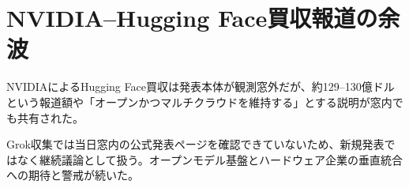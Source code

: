 \section{NVIDIA--Hugging Face買収報道の余波}
NVIDIAによるHugging Face買収は発表本体が観測窓外だが、約129--130億ドルという報道額や「オープンかつマルチクラウドを維持する」とする説明が窓内でも共有された。

Grok収集では当日窓内の公式発表ページを確認できていないため、新規発表ではなく継続議論として扱う。オープンモデル基盤とハードウェア企業の垂直統合への期待と警戒が続いた。
